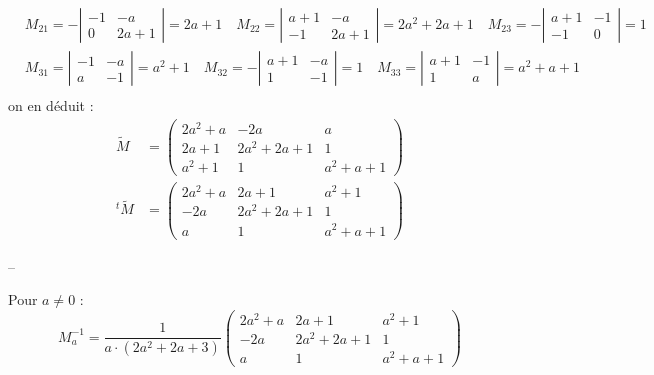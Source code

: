 {{$$\begin{aligned}
	& M_{21}=-\left|\begin{array}{cc}
		-1 & -a \\
		0 & 2 a+1
	\end{array}\right|=2 a+1 \quad M_{22}=\left|\begin{array}{cc}
		a+1 & -a \\
		-1 & 2 a+1
	\end{array}\right|=2 a^2+2 a+1 \quad M_{23}=-\left|\begin{array}{cc}
		a+1 & -1 \\
		-1 & 0
	\end{array}\right|=1 \\
	& M_{31}=\left|\begin{array}{cc}
		-1 & -a \\
		a & -1
	\end{array}\right|=a^2+1 \quad M_{32}=-\left|\begin{array}{cc}
		a+1 & -a \\
		1 & -1
	\end{array}\right|=1 \quad M_{33}=\left|\begin{array}{cc}
		a+1 & -1 \\
		1 & a
	\end{array}\right|=a^2+a+1 \\
	&
\end{aligned}
$$
on en déduit :
$$
\begin{aligned}
	\tilde{M} & =\left(\begin{array}{ccc}
		2 a^2+a & -2 a & a \\
		2 a+1 & 2 a^2+2 a+1 & 1 \\
		a^2+1 & 1 & a^2+a+1
	\end{array}\right) \\
	{ }^t \tilde{M} & =\left(\begin{array}{ccc}
		2 a^2+a & 2 a+1 & a^2+1 \\
		-2 a & 2 a^2+2 a+1 & 1 \\
		a & 1 & a^2+a+1
	\end{array}\right)
\end{aligned}
$$

--

Pour $a \neq 0$ :
$$
M_a^{-1}=\frac{1}{a \cdot\left(2 a^2+2 a+3\right)}\left(\begin{array}{ccc}
	2 a^2+a & 2 a+1 & a^2+1 \\
	-2 a & 2 a^2+2 a+1 & 1 \\
	a & 1 & a^2+a+1
\end{array}\right)
$$ }}
